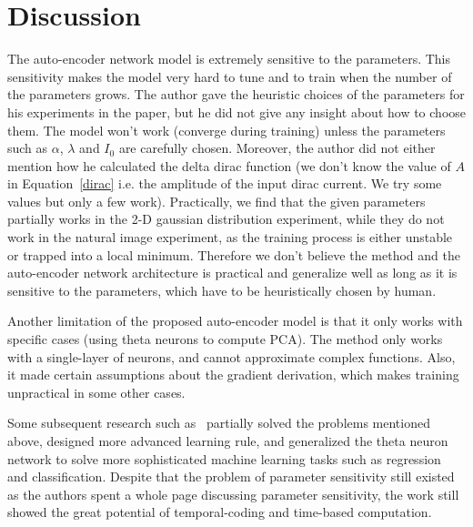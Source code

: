 \section{Discussion}
\label{discussion}

The auto-encoder network model is extremely sensitive to the parameters.
This sensitivity makes the model very hard to tune and to train when the number of the parameters grows.
The author gave the heuristic choices of the parameters for his experiments in the paper, 
but he did not give any insight about how to choose them. 
The model won't work (converge during training) unless the parameters such as 
$\alpha$, $\lambda$ and $I_0$ are carefully chosen.
Moreover, the author did not either mention how he calculated the delta dirac function 
(we don't know the value of $A$ in Equation~\ref{dirac} i.e. the amplitude of the input
dirac current. We try some values but only a few work).
Practically, we find that the given parameters partially works in the 2-D gaussian distribution experiment, 
while they do not work in the natural image experiment,
as the training process is either unstable or trapped into a local minimum. 
Therefore we don't believe the method and the auto-encoder network architecture is practical and generalize well
as long as it is sensitive to the parameters, which have to be heuristically chosen by human.

Another limitation of the proposed auto-encoder model is that it only works with specific cases
(using theta neurons to compute PCA).
The method only works with a single-layer of neurons, and cannot approximate complex functions.
Also, it made certain assumptions about the gradient derivation, which makes training unpractical in some other cases.

Some subsequent research such as~\cite{mckennoch2009spike} partially solved the problems mentioned above,
designed more advanced learning rule, 
and generalized the theta neuron network to solve more sophisticated machine learning tasks such as regression and classification.
Despite that the problem of parameter sensitivity still existed as the authors spent a whole page 
discussing parameter sensitivity, the work still showed the great potential of temporal-coding and time-based computation.

